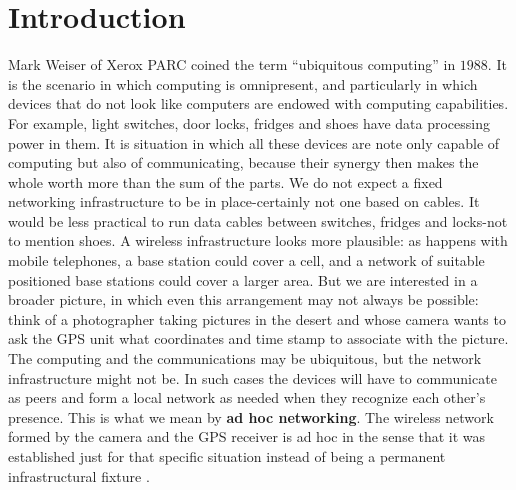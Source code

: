 \chapter{Introduction} %
\label{cha:introduction}
	
	Mark Weiser of Xerox PARC \cite{weiser1991computer} coined the term ``ubiquitous computing'' in $1988$. 
	It is the scenario in which computing is omnipresent, and particularly in which devices that do not look like computers are endowed with computing capabilities.
	For example, light switches, door locks, fridges and shoes have data processing power in them.
	It is situation in which all these devices are note only capable of computing but also of communicating, because their synergy then makes the whole worth more than the sum of the parts.
	We do not expect a fixed networking infrastructure to be in place-certainly not one based on cables.
	It would be less practical to run data cables between switches, fridges and locks-not to mention shoes.
	A wireless infrastructure looks more plausible: as happens with mobile telephones, a base station could cover a cell, and a network of suitable positioned base stations could cover a larger area.
	But we are interested in a broader picture, in which even this arrangement may not always be possible: think of a photographer taking pictures in the desert and whose camera wants to ask the GPS unit what coordinates and time stamp to associate with the picture.
	The computing and the communications may be ubiquitous, but the network infrastructure might not be.
	In such cases the devices will have to communicate as peers and form a local network as needed when they recognize each other's presence.
	This is what we mean by \textbf{ad hoc networking}.
	The wireless network formed by the camera and the GPS receiver is ad hoc in the sense that it was established just for that specific situation instead of being a permanent infrastructural fixture \cite{2002-Stajano-ubiquitous}.

